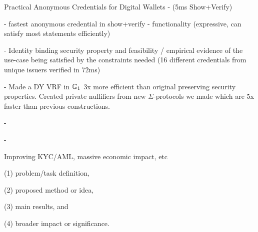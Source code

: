 
Practical Anonymous Credentials for Digital Wallets - (5ms Show+Verify)



- fastest anonymous credential in show+verify
- functionality (expressive, can satisfy most statements efficiently)

- Identity binding security property and feasibility / empirical evidence of the use-case being satisfied by the constraints needed (16 different credentials from unique issuers verified in 72ms) 

- Made a DY VRF in $\mathbb{G}_1$ 3x more efficient than original preserving security properties. Created private nullifiers from new $\Sigma$-protocols we made which are 5x faster than previous constructions. 

- 

- 




Improving KYC/AML, massive economic impact, etc

(1) problem/task definition, 

(2) proposed method or idea, 

(3) main results, and 

(4) broader impact or significance.





